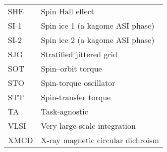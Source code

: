{\begin{longtable}[l]{ll}
        SHE   & Spin Hall effect                            \\
        SI-1  & Spin ice 1 (a kagome ASI phase)             \\
        SI-2  & Spin ice 2 (a kagome ASI phase)             \\
        SJG   & Stratified jittered grid                    \\
        SOT   & Spin--orbit torque                           \\
        STO   & Spin-torque oscillator                      \\
        STT   & Spin-transfer torque                        \\
        TA    & Task-agnostic                               \\
        VLSI  & Very large-scale integration                \\
        XMCD  & X-ray magnetic circular dichroism           \\
    \end{longtable}
}
